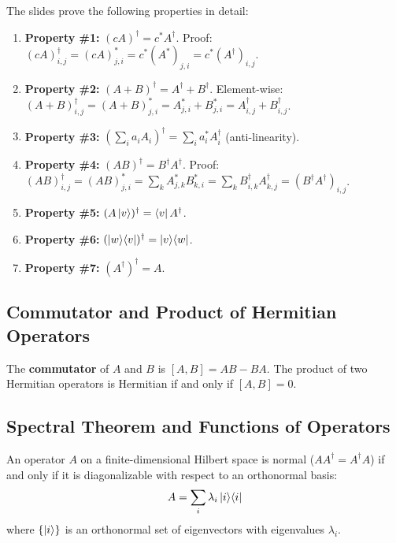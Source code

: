 \documentclass[10pt,a4paper]{article}
\begin{document}
The slides prove the following properties in detail:
\begin{enumerate}[nosep]
\item \textbf{Property \#1:} $(cA)^\dagger = c^*A^\dagger$. Proof: $(cA)^\dagger_{i,j} = (cA)^*_{j,i} = c^*(A^*)_{j,i} = c^*(A^\dagger)_{i,j}$.
\item \textbf{Property \#2:} $(A+B)^\dagger = A^\dagger+B^\dagger$. Element-wise: $(A+B)^\dagger_{i,j} = (A+B)^*_{j,i} = A^*_{j,i}+B^*_{j,i} = A^\dagger_{i,j}+B^\dagger_{i,j}$.
\item \textbf{Property \#3:} $(\sum_i a_i A_i)^\dagger = \sum_i a_i^* A_i^\dagger$ (anti-linearity).
\item \textbf{Property \#4:} $(AB)^\dagger = B^\dagger A^\dagger$. Proof: $(AB)^\dagger_{i,j} = (AB)^*_{j,i} = \sum_k A^*_{j,k}B^*_{k,i} = \sum_k B^\dagger_{i,k}A^\dagger_{k,j} = (B^\dagger A^\dagger)_{i,j}$.
\item \textbf{Property \#5:} $(A\ket{v})^\dagger = \bra{v}A^\dagger$.
\item \textbf{Property \#6:} $(\ket{w}\!\bra{v})^\dagger = \ket{v}\!\bra{w}$.
\item \textbf{Property \#7:} $(A^\dagger)^\dagger = A$.
\end{enumerate}

\subsection{Commutator and Product of Hermitian Operators}

\begin{tcolorbox}[defstyle, title={Definition: Commutator}]
The \textbf{commutator} of $A$ and $B$ is $[A,B]=AB-BA$. The product of two Hermitian operators is Hermitian if and only if $[A,B]=0$.
\end{tcolorbox}


\subsection{Spectral Theorem and Functions of Operators}

\begin{tcolorbox}[propstyle, title={Spectral Theorem (Finite Dimensional)}]
An operator $A$ on a finite-dimensional Hilbert space is normal ($AA^\dagger=A^\dagger A$) if and only if it is diagonalizable with respect to an orthonormal basis:
\[
A=\sum_i\lambda_i\ket{i}\!\bra{i}
\]
where $\{\ket{i}\}$ is an orthonormal set of eigenvectors with eigenvalues $\lambda_i$.
\end{tcolorbox}
\end{document}
